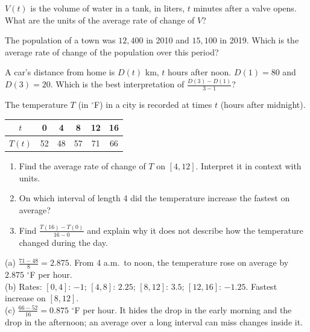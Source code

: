 \begin{exo}{}
$V(t)$ is the volume of water in a tank, in liters, $t$ minutes after a valve opens. What are the units of the average rate of change of $V$?
\end{exo}
\begin{exo}{}
The population of a town was $12{,}400$ in 2010 and $15{,}100$ in 2019. Which is the average rate of change of the population over this period?
\end{exo}
\begin{exo}{}
A car's distance from home is $D(t)$ km, $t$ hours after noon. $D(1)=80$ and $D(3)=20$. Which is the best interpretation of $\frac{D(3)-D(1)}{3-1}$?
\end{exo}
\begin{exo}{}
The temperature $T$ (in $^\circ$F) in a city is recorded at times $t$ (hours after midnight).
\begin{center}\begin{tabular}{c|ccccc}$t$&0&4&8&12&16\\\hline$T(t)$&52&48&57&71&66\end{tabular}\end{center}
\begin{enumerate}[label=(\alph*)]
\item Find the average rate of change of $T$ on $[4,12]$. Interpret it in context with units.
\item On which interval of length 4 did the temperature increase the fastest on average?
\item Find $\frac{T(16)-T(0)}{16-0}$ and explain why it does not describe how the temperature changed during the day.
\end{enumerate}
\begin{solution}
(a) $\frac{71-48}{8}=2.875$. From 4 a.m.\ to noon, the temperature rose on average by $2.875$ $^\circ$F per hour.\\
(b) Rates: $[0,4]$: $-1$; $[4,8]$: $2.25$; $[8,12]$: $3.5$; $[12,16]$: $-1.25$. Fastest increase on $[8,12]$.\\
(c) $\frac{66-52}{16}=0.875$ $^\circ$F per hour. It hides the drop in the early morning and the drop in the afternoon; an average over a long interval can miss changes inside it.
\end{solution}
\end{exo}

